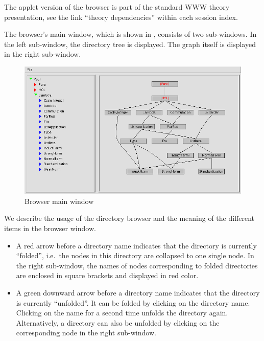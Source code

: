 \begin{isabellebody}
\begin{isamarkuptext}
  \medskip The applet version of the browser is part of the standard
  WWW theory presentation, see the link ``theory dependencies'' within
  each session index.%
\end{isamarkuptext}%
\isamarkuptrue%
%
\isamarkuptrue%
%
\begin{isamarkuptext}%
The browser's main window, which is shown in
  , consists of two sub-windows.  In the
  left sub-window, the directory tree is displayed. The graph itself
  is displayed in the right sub-window.

  \begin{figure}[ht]
  \includegraphics[width=\textwidth]{browser_screenshot}
  \caption{\label{fig:browserwindow} Browser main window}
  \end{figure}%
\end{isamarkuptext}%
\isamarkuptrue%
%
\isamarkuptrue%
%
\begin{isamarkuptext}%
We describe the usage of the directory browser and the meaning of
  the different items in the browser window.

  \begin{itemize}

  \item A red arrow before a directory name indicates that the
  directory is currently ``folded'', i.e.~the nodes in this directory
  are collapsed to one single node. In the right sub-window, the names
  of nodes corresponding to folded directories are enclosed in square
  brackets and displayed in red color.

  \item A green downward arrow before a directory name indicates that
  the directory is currently ``unfolded''. It can be folded by
  clicking on the directory name.  Clicking on the name for a second
  time unfolds the directory again.  Alternatively, a directory can
  also be unfolded by clicking on the corresponding node in the right
  sub-window.


\end{itemize}
\end{isamarkuptext}
\end{isabellebody}
